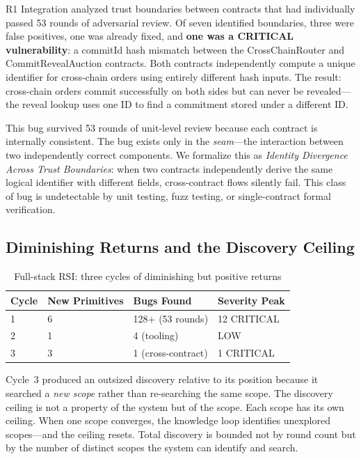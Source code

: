 \documentclass[11pt, a4paper]{article}
\begin{document}
R1 Integration analyzed trust boundaries between contracts that had individually passed 53 rounds of adversarial review. Of seven identified boundaries, three were false positives, one was already fixed, and \textbf{one was a CRITICAL vulnerability}: a commitId hash mismatch between the CrossChainRouter and CommitRevealAuction contracts. Both contracts independently compute a unique identifier for cross-chain orders using entirely different hash inputs. The result: cross-chain orders commit successfully on both sides but can never be revealed---the reveal lookup uses one ID to find a commitment stored under a different ID.

This bug survived 53 rounds of unit-level review because each contract is internally consistent. The bug exists only in the \emph{seam}---the interaction between two independently correct components. We formalize this as \emph{Identity Divergence Across Trust Boundaries}: when two contracts independently derive the same logical identifier with different fields, cross-contract flows silently fail. This class of bug is undetectable by unit testing, fuzz testing, or single-contract formal verification.

\subsection{Diminishing Returns and the Discovery Ceiling}

\begin{table}[h]
\centering
\caption{Full-stack RSI: three cycles of diminishing but positive returns}
\label{tab:rsi-cycles}
\begin{tabular}{@{}llll@{}}
\toprule
\textbf{Cycle} & \textbf{New Primitives} & \textbf{Bugs Found} & \textbf{Severity Peak} \\
\midrule
1 & 6 & 128+ (53 rounds) & 12 CRITICAL \\
2 & 1 & 4 (tooling) & LOW \\
3 & 3 & 1 (cross-contract) & 1 CRITICAL \\
\bottomrule
\end{tabular}
\end{table}

Cycle~3 produced an outsized discovery relative to its position because it searched a \emph{new scope} rather than re-searching the same scope. The discovery ceiling is not a property of the system but of the scope. Each scope has its own ceiling. When one scope converges, the knowledge loop identifies unexplored scopes---and the ceiling resets. Total discovery is bounded not by round count but by the number of distinct scopes the system can identify and search.
\end{document}
